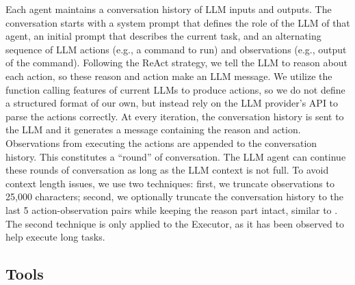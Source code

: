Each agent maintains a conversation history of LLM inputs and outputs.
The conversation starts with a system prompt that defines the role of the LLM of that agent, an initial prompt that describes the current task, and an alternating sequence of LLM actions (e.g., a command to run) and observations (e.g., output of the command).
Following the ReAct strategy, we tell the LLM to reason about each action, so these reason and action make an LLM message.
We utilize the function calling features of current LLMs to produce actions, so we do not define a structured format of our own, but instead rely on the LLM provider's API to parse the actions correctly.
At every iteration, the conversation history is sent to the LLM and it generates a message containing the reason and action. Observations from executing the actions are appended to the conversation history. This constitutes a ``round'' of conversation.
The LLM agent can continue these rounds of conversation as long as the LLM context is not full. To avoid context length issues, we use two techniques: first, we truncate observations to 25,000 characters; second, we optionally truncate the conversation history to the last 5 action-observation pairs while keeping the reason part intact, similar to \cite{yang2023intercode, yang2024sweagent, abramovich2024enigma}. The second technique is only applied to the Executor, as it has been observed to help execute long tasks.

\subsection{Tools}

